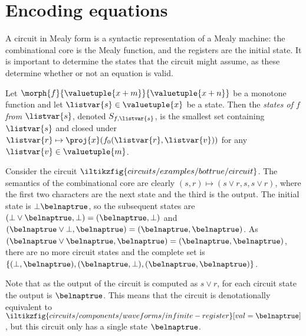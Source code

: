 \section{Encoding equations}\label{sec:encoding}

A circuit in Mealy form is a syntactic representation of a Mealy machine: the
combinational core is the Mealy function, and the registers are the initial
state.
It is important to determine the states that the circuit might assume, as these
determine whether or not an equation is valid.

\begin{definition}[States]
    Let \(\morph{f}{\valuetuple{x+m}}{\valuetuple{x+n}}\) be a
    monotone function and let \(\listvar{s} \in  \valuetuple{x}\) be a state.
    Then the \emph{states of \(f\) from \(\listvar{s}\)}, denoted
    \(S_{f,\listvar{s}}\), is the smallest set containing \(\listvar{s}\) and
    closed under \(
    \listvar{r}
    \mapsto
    \proj{x}\mleft(f_0(\listvar{r},\listvar{v})\mright)
    \) for any \(\listvar{v} \in \valuetuple{m}\).
\end{definition}

\begin{example}\label{ex:circuit-states}
    Consider the circuit \(
    \iltikzfig{circuits/examples/bottrue/circuit}
    \).
    The semantics of the combinational core are clearly
    \((s, r) \mapsto \left(s \lor r, s, s \lor r\right)\), where the first two characters are the
    next state and the third is the output.
    The initial state is \(\bot\belnaptrue\), so the subsequent states are
    \((\bot \lor \belnaptrue, \bot) = (\belnaptrue,\bot)\) and
    \((\belnaptrue \lor \bot, \belnaptrue) = (\belnaptrue, \belnaptrue)\).
    As \((\belnaptrue \lor \belnaptrue, \belnaptrue) = (\belnaptrue, \belnaptrue)\),
    there are no more circuit states and the complete set is
    \(\{(\bot, \belnaptrue),(\belnaptrue,\bot),(\belnaptrue,\belnaptrue)\}\).

    Note that as the output of the circuit is computed as \(s \lor r\), for each
    circuit state the output is \(\belnaptrue\).
    This means that the circuit is denotationally equivalent to \(
    \iltikzfig{circuits/components/waveforms/infinite-register}[val=\belnaptrue]
    \), but this circuit only has a single state \(\belnaptrue\).
\end{example}


